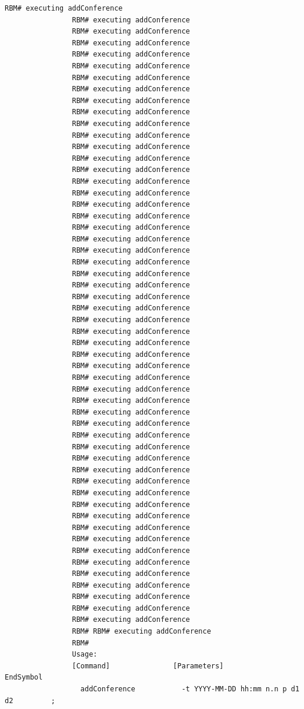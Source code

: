 \documentclass{article}
\begin{document}
\begin{Verbatim}[gobble=8]
                RBM# executing addConference
                RBM# executing addConference
                RBM# executing addConference
                RBM# executing addConference
                RBM# executing addConference
                RBM# executing addConference
                RBM# executing addConference
                RBM# executing addConference
                RBM# executing addConference
                RBM# executing addConference
                RBM# executing addConference
                RBM# executing addConference
                RBM# executing addConference
                RBM# executing addConference
                RBM# executing addConference
                RBM# executing addConference
                RBM# executing addConference
                RBM# executing addConference
                RBM# executing addConference
                RBM# executing addConference
                RBM# executing addConference
                RBM# executing addConference
                RBM# executing addConference
                RBM# executing addConference
                RBM# executing addConference
                RBM# executing addConference
                RBM# executing addConference
                RBM# executing addConference
                RBM# executing addConference
                RBM# executing addConference
                RBM# executing addConference
                RBM# executing addConference
                RBM# executing addConference
                RBM# executing addConference
                RBM# executing addConference
                RBM# executing addConference
                RBM# executing addConference
                RBM# executing addConference
                RBM# executing addConference
                RBM# executing addConference
                RBM# executing addConference
                RBM# executing addConference
                RBM# executing addConference
                RBM# executing addConference
                RBM# executing addConference
                RBM# executing addConference
                RBM# executing addConference
                RBM# executing addConference
                RBM# executing addConference
                RBM# executing addConference
                RBM# executing addConference
                RBM# executing addConference
                RBM# executing addConference
                RBM# executing addConference
                RBM# RBM# executing addConference
                RBM#
                Usage: 
                [Command]               [Parameters]                            EndSymbol     
                  addConference           -t YYYY-MM-DD hh:mm n.n p d1 d2         ;           
                

\end{Verbatim}
\end{document}

